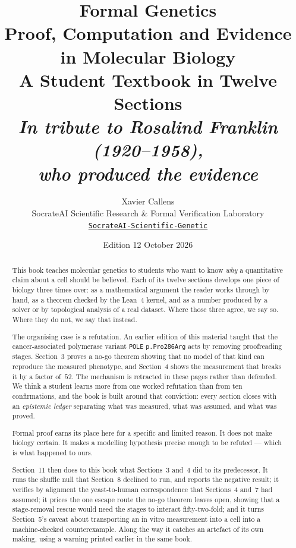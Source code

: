 \documentclass[11pt,a4paper]{article}
\title{\vspace{-1.5cm}\textbf{Formal Genetics}\\[0.35em]
  \large Proof, Computation and Evidence in Molecular Biology\\[0.55em]
  \normalsize A Student Textbook in Twelve Sections\\[0.9em]
  \normalsize\itshape In tribute to Rosalind Franklin (1920--1958),\\
  \normalsize\itshape who produced the evidence}
\author{Xavier Callens\\
  \small SocrateAI Scientific Research \& Formal Verification Laboratory\\
  \small \href{https://github.com/xaviercallens/SocrateAI-Scientific-Genetic}{\texttt{SocrateAI-Scientific-Genetic}}}
\date{Edition 12 \quad\textperiodcentered\quad October 2026}
\theoremstyle{plain}
\theoremstyle{definition}
\theoremstyle{remark}
\begin{document}
\maketitle
\thispagestyle{empty}



\begin{abstract}
\noindent
This book teaches molecular genetics to students who want to know \emph{why} a
quantitative claim about a cell should be believed. Each of its twelve sections
develops one piece of biology three times over: as a mathematical argument the
reader works through by hand, as a theorem checked by the Lean~4 kernel, and as
a number produced by a solver or by topological analysis of a real dataset.
Where those three agree, we say so. Where they do not, we say that instead.

The organising case is a refutation. An earlier edition of this material taught
that the cancer-associated polymerase variant \texttt{POLE} \texttt{p.Pro286Arg}
acts by removing proofreading stages. Section~3 proves a no-go theorem showing
that no model of that kind can reproduce the measured phenotype, and Section~4
shows the measurement that breaks it by a factor of~$52$. The mechanism is
retracted in these pages rather than defended. We think a student learns more
from one worked refutation than from ten confirmations, and the book is built
around that conviction: every section closes with an \emph{epistemic ledger}
separating what was measured, what was assumed, and what was proved.

Formal proof earns its place here for a specific and limited reason. It does not
make biology certain. It makes a modelling hypothesis precise enough to be
refuted --- which is what happened to ours.

Section~11 then does to this book what Sections~3 and~4 did to its predecessor.
It runs the shuffle null that Section~8 declined to run, and reports the
negative result; it verifies by alignment the yeast-to-human correspondence that
Sections~4 and~7 had assumed; it prices the one escape route the no-go theorem
leaves open, showing that a stage-removal rescue would need the stages to
interact fifty-two-fold; and it turns Section~5's caveat about transporting an
in vitro measurement into a cell into a machine-checked counterexample. Along
the way it catches an artefact of its own making, using a warning printed
earlier in the same book.


\end{abstract}
\end{document}
